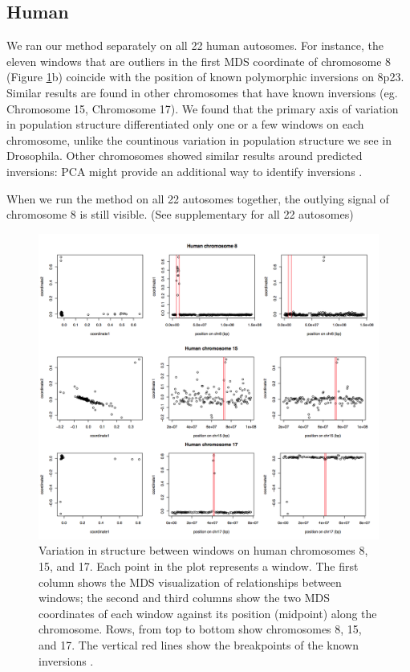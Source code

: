 \documentclass[11pt, oneside]{article}   	%
\begin{document}
\subsection{Human}
We ran our method separately on all 22 human autosomes. 
For instance, the eleven windows that are outliers in the first MDS coordinate of chromosome 8 (Figure \ref{fig:mds_human}b) coincide with the position of known polymorphic inversions on 8p23. 
Similar results are found in other chromosomes that have known inversions (eg. Chromosome 15, Chromosome 17).
We found that the primary axis of variation in population structure differentiated only one or a few windows on each chromosome, 
unlike the countinous variation in population structure we see in Drosophila.
Other chromosomes showed similar results around predicted inversions: PCA might provide an additional way to identify inversions \citep{ma2012investigation}.

When we run the method on all 22 autosomes together, the outlying signal of chromosome 8 is still visible. (See supplementary for all 22 autosomes)

\begin{figure}
    \begin{center}
       \includegraphics{Fig4_temp}
    \end{center}
    \caption{
         Variation in structure between windows on human chromosomes 8, 15, and 17. 
         Each point in the plot represents a window.
         The first column shows the MDS visualization of relationships between windows;
         the second and third columns show the two MDS coordinates of each window against its position (midpoint) along the chromosome. 
         Rows, from top to bottom show chromosomes 8, 15, and 17. 
         The vertical red lines show the breakpoints of the known inversions \citep{antonacci2009characterization}.
        \label{fig:mds_human}
    }
\end{figure}
\end{document}
